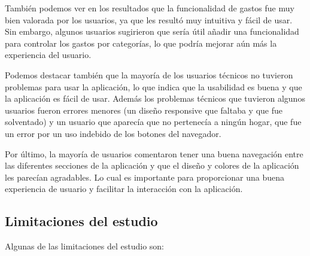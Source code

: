 También podemos ver en los resultados que la funcionalidad de gastos fue muy bien valorada por los usuarios,
ya que les resultó muy intuitiva y fácil de usar. Sin embargo, algunos usuarios sugirieron que sería útil añadir una funcionalidad para controlar los gastos por categorías, lo que podría mejorar aún más la experiencia del usuario.

Podemos destacar también que la mayoría de los usuarios técnicos no tuvieron problemas para usar la aplicación, lo que indica que la usabilidad es buena y que la aplicación es fácil de usar.
Además los problemas técnicos que tuvieron algunos usuarios fueron errores menores (un diseño responsive que faltaba y que fue solventado) y un usuario que aparecía que no pertenecía a ningún hogar, que fue 
un error por un uso indebido de los botones del navegador.

Por último, la mayoría de usuarios comentaron tener una buena navegación entre las diferentes secciones de la aplicación y 
que el diseño y colores de la aplicación les parecían agradables. 
Lo cual es importante para proporcionar una buena experiencia de usuario y facilitar la interacción con la aplicación. 


\subsection{Limitaciones del estudio}

Algunas de las limitaciones del estudio son: 

